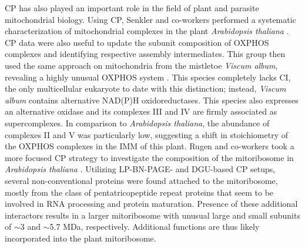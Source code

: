 CP has also played an important role in the field of plant and parasite mitochondrial biology. Using CP, Senkler and co-workers performed a systematic characterization of mitochondrial complexes in the plant \emph{Arabidopsis thaliana} \cite{Senkler_2017}. CP data were also useful to update the subunit composition of OXPHOS complexes and identifying respective assembly intermediates. This group then used the same approach on mitochondria from the mistletoe \emph{Viscum album}, revealing a highly unusual OXPHOS system \cite{Senkler_2018}. This species completely lacks CI, the only multicellular eukaryote to date with this distinction; instead, \emph{Viscum album} contains alternative NAD(P)H oxidoreductases. This species also expresses an alternative oxidase and its complexes III and IV are firmly associated as supercomplexes. In comparison to \emph{Arabidopsis thaliana}, the abundance of complexes II and V was particularly low, suggesting a shift in stoichiometry of the OXPHOS complexes in the IMM of this plant. Rugen and co-workers took a more focused CP strategy to investigate the composition of the mitoribosome in \emph{Arabidopsis thaliana} \cite{Rugen_2019}. Utilizing LP-BN-PAGE- and DGU-based CP setups, several non-conventional proteins were found attached to the mitoribosome, mostly from the class of pentatricopeptide repeat proteins that seem to be involved in RNA processing and protein maturation. Presence of these additional interactors results in a larger mitoribosome with unusual large and small subunits of $\sim$3 and $\sim$5.7 MDa, respectively. Additional functions are thus likely incorporated into the plant mitoribosome.\\
